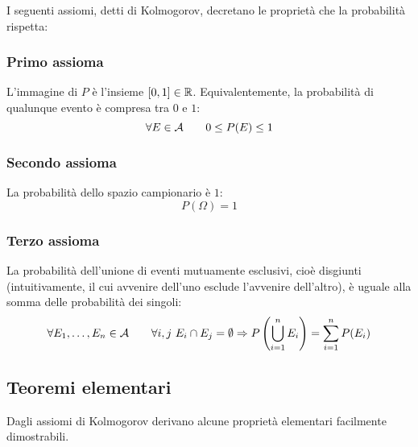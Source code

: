 I seguenti assiomi, detti di Kolmogorov, decretano le proprietà che la probabilità rispetta:


\subsubsection{Primo assioma}
L'immagine di $P$ è l'insieme $[0,1]\in\mathbb R$. Equivalentemente, la probabilità di qualunque evento è compresa tra $0$ e $1$:
\begin{equation*}
	\forall E\in\mathcal A\qquad 0\leq P(E)\leq 1
\end{equation*}


\subsubsection{Secondo assioma}
La probabilità dello spazio campionario è $1$:
\begin{equation*}
	P(\Omega)=1
\end{equation*}


\subsubsection{Terzo assioma}
La probabilità dell'unione di eventi mutuamente esclusivi, cioè disgiunti (intuitivamente, il cui avvenire dell'uno esclude l'avvenire dell'altro), è uguale alla somma delle probabilità dei singoli:
\begin{equation*}
	\forall E_1,\dots,E_n\in\mathcal A\qquad \forall i,j~E_i\cap E_j = \emptyset \Rightarrow P\left( \bigcup_{i=1}^n E_i \right)=\sum_{i=1}^n P(E_i)
\end{equation*}



\subsection{Teoremi elementari}
Dagli assiomi di Kolmogorov derivano alcune proprietà elementari facilmente dimostrabili.


